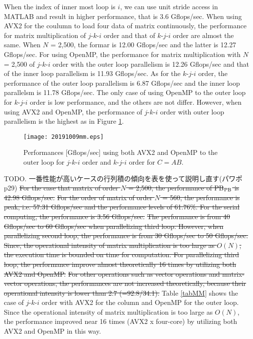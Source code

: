 \documentclass{IOS-Book-Article}
\begin{document}
When the index of inner most loop is $i$, we can use unit stride access in MATLAB and result in higher performance, that is 3.6 Gflops/sec.
When using AVX2 for the coulumn to load four data of matrix continuously, the performance for matrix multiplication of $j$-$k$-$i$ order and that of $k$-$j$-$i$ order are almost the same.
When $N$ = 2,500, the formar is 12.00 Gflops/sec and the latter is 12.27 Gflops/sec.
For using OpenMP, the performance for matrix multiplication with $N$ = 2,500 of $j$-$k$-$i$ order with the outer loop parallelism is 12.26 Gflops/sec
and that of the inner loop parallelism is 11.93 Gflops/sec.
As for the $k$-$j$-$i$ order, the performance of the outer loop parallelism is 6.87 Gflops/sec and the inner loop parallelsm is 11.78 Gflops/sec.
The only case of using OpenMP to the outer loop for $k$-$j$-$i$ order is low performance, and the others are not differ.
However, when using AVX2 and OpenMP, the performance of $j$-$k$-$i$ order with outer loop parallelism is the highest as in Figure \ref{figMM3}. 

\begin{figure}[htbp]
  \begin{center}
    \texttt{[image: 20191009mm.eps]}
         \caption{Performances [Gflops/sec] using both AVX2 and OpenMP to the outer loop for $j$-$k$-$i$ order and $k$-$j$-$i$ order for $C = AB$.}
    \label{figMM3}
  \end{center}
\end{figure}

TODO. 一番性能が高いケースの行列積の傾向を表を使って説明し直す(パワポp29)
\sout{For the case that matrix of order $N$ = 2,500, the performance of PB$_{\rm{PB}}$ is 42.98 Gflops/sec.}
\sout{For the order of matrix of order $N$ = 560, the performance is peak, i.e. 57.31 Gflops/sec and the performance levels of 61.76\%. For the serial computing, the performance is 3.56 Gflops/sec.}
\sout{The performance is from 40 Gflops/sec to 60 Gflops/sec when parallelizing third loop. However, when parallelizing second loop, the performance is from 30 Gflops/sec to 50 Gflops/sec. }
\sout{Since, the operational intensity of matrix multiplication is too large as $O(N)$, the execution time is bounded on time for computation. For parallelizing third loop, the performance improve almost theoretically 16 times by utilizing both AVX2 and OpenMP.}
\sout{For other operations such as vector operations and matrix-vector operations, the performances are not increased theoretically, because their operational intensity is lower than 2.7 (=92.8/34.1).}
Table \ref{tabMM} shows the case of $j$-$k$-$i$ order with AVX2 for the column and OpenMP for the outer loop. 
Since the operational intensity of matrix multiplication is too large as $O(N)$, the performance improved near 16 times (AVX2 x four-core) by utilizing both AVX2 and OpenMP in this way.
\end{document}
